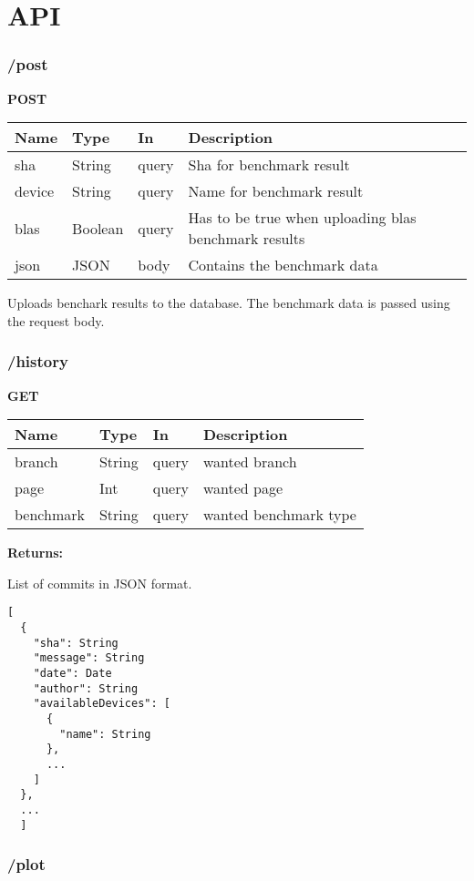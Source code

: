 \section{API}

\subsubsection*{/post}

\textbf{POST}

\begin{tabular}{ l l l l }
  Name & Type & In & Description \\ 
  \hline
  sha & String & query & Sha for benchmark result \\
  device & String & query & Name for benchmark result \\
  blas & Boolean & query & Has to be true when uploading blas benchmark results \\
  json & JSON & body & Contains the benchmark data \\
  \hline
\end{tabular}

Uploads benchark results to the database. The benchmark data is passed using the request body.

\subsubsection*{/history}

\textbf{GET}

\begin{tabular}{ l l l l }
  Name & Type & In & Description \\ 
  \hline
  branch & String & query & wanted branch \\
  page & Int & query & wanted page \\
  benchmark & String & query & wanted benchmark type \\
  \hline
\end{tabular}

\textbf{Returns: }

List of commits in JSON format.
\begin{lstlisting}
[
  {
    "sha": String
    "message": String
    "date": Date
    "author": String
    "availableDevices": [
      {
        "name": String
      },
      ...
    ]
  },
  ...
  ]
\end{lstlisting}

\subsubsection*{/plot}

